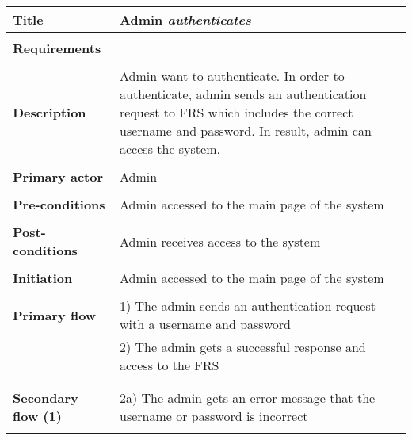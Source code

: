 \documentclass[a4paper,11pt]{article}
\begin{document}
\begin{tabular}{|p{4cm}|p{10cm}|} \hline 
  \textbf{Title} &   Admin \emph{authenticates}  
   
  \\ \hline \rowcolor{Gray} & \\ \hline 
  \textbf{Requirements} &     
  \\ \hline \rowcolor{Gray} & \\ \hline 
  \textbf{Description} &  Admin want to authenticate. In order to authenticate, admin sends an authentication request to FRS which includes the correct username and password. In result, admin can access the system. 
   
  \\ \hline \rowcolor{Gray} & \\ \hline 
   
  \textbf{Primary actor} & Admin   
   
  \\ \hline \rowcolor{Gray} & \\ \hline  
   
  \textbf{Pre-conditions} &   Admin accessed to the main page of the system 
   
  \\ \hline \rowcolor{Gray} & \\ \hline 
   
  \textbf{Post-conditions} &   Admin receives access to the system 
   
  \\ \hline \rowcolor{Gray} & \\ \hline  
   
  \textbf{Initiation} & Admin accessed to the main page of the system 
   
  \\ \hline \rowcolor{Gray} & \\ \hline  
   
  \textbf{Primary flow} &  
  1) The admin sends an authentication request with a username and password  \\& 
  2) The admin gets a successful response and access to the FRS \\& 
   
  \\ \hline \rowcolor{Gray} & \\ \hline  
   
  \textbf{Secondary flow (1)} &  
  2a) The admin gets an error message that the username or password is incorrect \\&  
   
   
  \\ \hline   
\end{tabular} 
\end{document}
